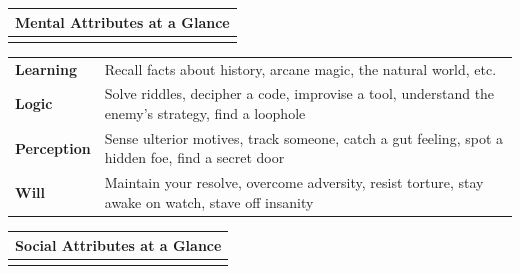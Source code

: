 \documentclass[12pt]{report}
\begin{document}
\begin{longtable}[c]{@{}l@{}}
\toprule
Mental Attributes at a Glance\tabularnewline
\midrule
\endhead
\tabularnewline
\bottomrule
\end{longtable}

\begin{longtable}[c]{@{}ll@{}}
\toprule
\begin{minipage}[t]{0.03\columnwidth}\raggedright\strut
\textbf{Learning}
\strut\end{minipage} &
\begin{minipage}[t]{0.03\columnwidth}\raggedright\strut
Recall facts about history, arcane magic, the natural world, etc.
\strut\end{minipage}\tabularnewline
\begin{minipage}[t]{0.03\columnwidth}\raggedright\strut
\textbf{Logic}
\strut\end{minipage} &
\begin{minipage}[t]{0.03\columnwidth}\raggedright\strut
Solve riddles, decipher a code, improvise a tool, understand the enemy's
strategy, find a loophole
\strut\end{minipage}\tabularnewline
\begin{minipage}[t]{0.03\columnwidth}\raggedright\strut
\textbf{Perception}
\strut\end{minipage} &
\begin{minipage}[t]{0.03\columnwidth}\raggedright\strut
Sense ulterior motives, track someone, catch a gut feeling, spot a
hidden foe, find a secret door
\strut\end{minipage}\tabularnewline
\begin{minipage}[t]{0.03\columnwidth}\raggedright\strut
\textbf{Will}
\strut\end{minipage} &
\begin{minipage}[t]{0.03\columnwidth}\raggedright\strut
Maintain your resolve, overcome adversity, resist torture, stay awake on
watch, stave off insanity
\strut\end{minipage}\tabularnewline
\bottomrule
\end{longtable}

\begin{longtable}[c]{@{}l@{}}
\toprule
Social Attributes at a Glance\tabularnewline
\midrule
\endhead
\tabularnewline
\bottomrule
\end{longtable}
\end{document}
